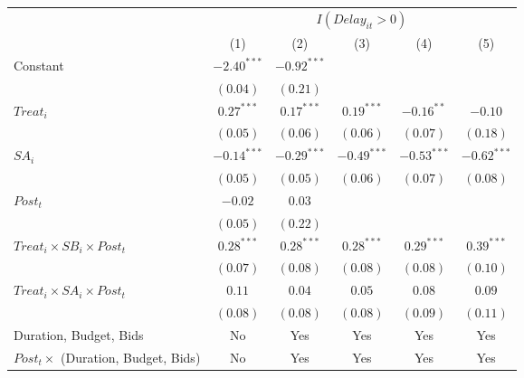 \documentclass[
]{article}
\begin{document}
\begin{table}
\begin{center}
\begin{tabular}{l c c c c c}
\hline
 & \multicolumn{5}{c}{$I(Delay_{it}>0)$} \\
\cline{2-6}
 & (1) & (2) & (3) & (4) & (5) \\
\hline
Constant                                   & $-2.40^{***}$ & $-0.92^{***}$ &               &               &               \\
                                           & $(0.04)$      & $(0.21)$      &               &               &               \\
$Treat_i$                                  & $0.27^{***}$  & $0.17^{***}$  & $0.19^{***}$  & $-0.16^{**}$  & $-0.10$       \\
                                           & $(0.05)$      & $(0.06)$      & $(0.06)$      & $(0.07)$      & $(0.18)$      \\
$SA_i$                                     & $-0.14^{***}$ & $-0.29^{***}$ & $-0.49^{***}$ & $-0.53^{***}$ & $-0.62^{***}$ \\
                                           & $(0.05)$      & $(0.05)$      & $(0.06)$      & $(0.07)$      & $(0.08)$      \\
$Post_t$                                   & $-0.02$       & $0.03$        &               &               &               \\
                                           & $(0.05)$      & $(0.22)$      &               &               &               \\
$Treat_i \times SB_i \times Post_t$        & $0.28^{***}$  & $0.28^{***}$  & $0.28^{***}$  & $0.29^{***}$  & $0.39^{***}$  \\
                                           & $(0.07)$      & $(0.08)$      & $(0.08)$      & $(0.08)$      & $(0.10)$      \\
$Treat_i \times SA_i \times Post_t$        & $0.11$        & $0.04$        & $0.05$        & $0.08$        & $0.09$        \\
                                           & $(0.08)$      & $(0.08)$      & $(0.08)$      & $(0.09)$      & $(0.11)$      \\
\hline
Duration, Budget, Bids                     & No            & Yes           & Yes           & Yes           & Yes           \\
$Post_t \times $  (Duration, Budget, Bids) & No            & Yes           & Yes           & Yes           & Yes           \\

\end{tabular}
\end{center}
\end{table}
\end{document}
